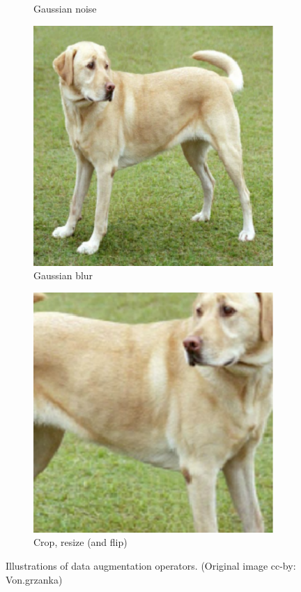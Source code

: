 \begin{figure}[t]
\begin{subfigure}{.19\textwidth}
  \caption{Gaussian noise}
\end{subfigure}\begin{subfigure}{.19\textwidth}
  \centering
  \includegraphics[width=0.9\linewidth]{chapters/assets/ssl_figs/transforms/img_gblur.pdf}
  \caption{Gaussian blur}
\end{subfigure}\begin{subfigure}{.19\textwidth}
  \centering
  \includegraphics[width=0.9\linewidth]{chapters/assets/ssl_figs/transforms/img_crop.pdf}
  \caption{Crop, resize (and flip)}
\end{subfigure}\vskip -0.05in
\caption{Illustrations of data augmentation operators. (Original image cc-by: Von.grzanka)}
\label{fig:simclr-data_aug}
\end{figure}
